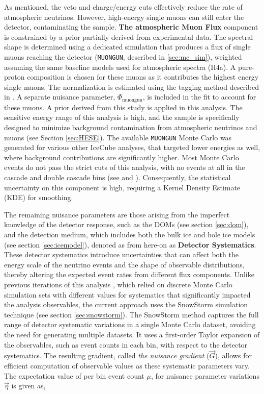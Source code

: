 As mentioned, the veto and charge/energy cuts effectively reduce the rate of atmospheric neutrinos. However, high-energy single muons can still enter the detector, contaminating the sample. \textbf{The atmospheric Muon Flux} component is constrained by a prior partially derived from experimental data. The spectral shape is determined using a dedicated simulation that produces a flux of single muons reaching the detector (\texttt{MUONGUN}, described in \ref{sec:mc_sim}), weighted assuming the same baseline models used for atmospheric spectra (H4a). A pure-proton composition is chosen for these muons as it contributes the highest energy single muons. The normalization is estimated using the tagging method described in \cite{HESE7_sample}. A separate nuisance parameter, $\Phi_{\mathrm{muongun}}$, is included in the fit to account for these muons. A prior derived from this study is applied in this analysis. The sensitive energy range of this analysis is high, and the sample is specifically designed to minimize background contamination from atmospheric neutrinos and muons (see Section \ref{sec:HESE}). The available \texttt{MUONGUN} Monte Carlo was generated for various other IceCube analyses, that targeted lower energies as well, where background contributions are significantly higher. Most Monte Carlo events do not pass the strict cuts of this analysis, with no events at all in the cascade and double cascade bins (see  and ). Consequently, the statistical uncertainty on this component is high, requiring a Kernel Density Estimate (KDE) for smoothing.

The remaining nuisance parameters are those arising from the imperfect knowledge of the detector response, such as the DOMs (see section \ref{sec:dom}), and the detection medium, which includes both the bulk ice and hole ice models (see section \ref{sec:icemodel}), denoted as from here-on as \textbf{Detector Systematics}. These detector systematics introduce uncertainties that can affect both the energy scale of the neutrino events and the shape of observable distributions, thereby altering the expected event rates from different flux components. Unlike previous iterations of this analysis , which relied on discrete Monte Carlo simulation sets with different values for systematics that significantly impacted the analysis observables, the current approach uses the SnowStorm simulation technique (see section \ref{sec:snowstorm}). The SnowStorm method  captures the full range of detector systematic variations in a single Monte Carlo dataset, avoiding the need for generating multiple datasets. It uses a first-order Taylor expansion of the observables, such as event counts in each bin, with respect to the detector systematics. The resulting gradient, called \emph{the nuisance gradient} ($\vec{G}$), allows for efficient computation of observable values as these systematic parameters vary. The expectation value of per bin event count $\mu$, for nuisance parameter variations $\vec{\eta}$ is given as,

